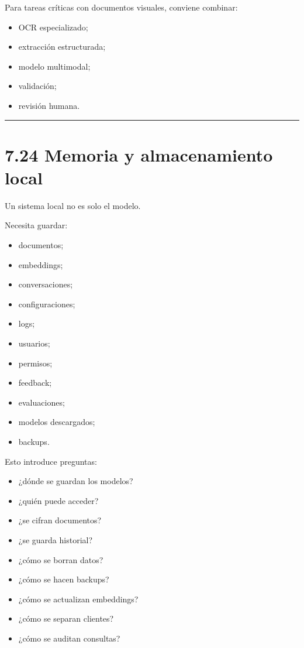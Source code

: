 Para tareas críticas con documentos visuales, conviene combinar:

\begin{itemize}
\tightlist
\item
  OCR especializado;
\item
  extracción estructurada;
\item
  modelo multimodal;
\item
  validación;
\item
  revisión humana.
\end{itemize}

\begin{center}\rule{0.5\linewidth}{0.5pt}\end{center}

\section{7.24 Memoria y almacenamiento
local}\label{memoria-y-almacenamiento-local}

Un sistema local no es solo el modelo.

Necesita guardar:

\begin{itemize}
\tightlist
\item
  documentos;
\item
  embeddings;
\item
  conversaciones;
\item
  configuraciones;
\item
  logs;
\item
  usuarios;
\item
  permisos;
\item
  feedback;
\item
  evaluaciones;
\item
  modelos descargados;
\item
  backups.
\end{itemize}

Esto introduce preguntas:

\begin{itemize}
\tightlist
\item
  ¿dónde se guardan los modelos?
\item
  ¿quién puede acceder?
\item
  ¿se cifran documentos?
\item
  ¿se guarda historial?
\item
  ¿cómo se borran datos?
\item
  ¿cómo se hacen backups?
\item
  ¿cómo se actualizan embeddings?
\item
  ¿cómo se separan clientes?
\item
  ¿cómo se auditan consultas?
\end{itemize}


